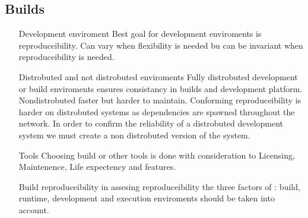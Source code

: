 \documentclass{article}
\begin{document}
\begin{itemize}
\begin{itemize}
    \subsection{Builds}
    \begin{itemize}
    \item[Development enviroment] Best goal for development enviroments is reproduceibility. Can vary when flexibility is needed bu can be invariant when reproduceibility is needed.
    \item [ Distrobuted and not distrobuted enviroments] Fully distrobuted development or build enviroments ensures consistancy in builds and development platform. Nondistrobuted faster but harder to maintain.
    Conforming reproduceibility is harder on distrobuted systems as dependencies are spawned throughout the network. In order to confirm the reliability of a distrobuted development system we must create a non distrobuted version of the system.
    \item[Tools] Choosing build or other tools is done with consideration to Licensing, Maintenence, Life expectency and features. 
    \item [Build reproduceibility] in assesing reproduceibility the three factors of : build, runtime, development and execution enviroments should be taken into account.
    \end{itemize}


\end{itemize}
\end{itemize}
\end{document}

